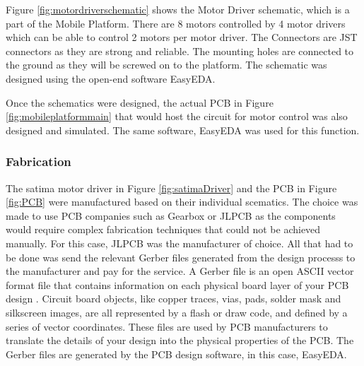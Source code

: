 Figure \ref{fig:motordriverschematic} shows the Motor Driver schematic, which is a part of the Mobile Platform. There are 8 motors controlled by 4 motor drivers which can be able to control 2 motors per motor driver. The Connectors are JST connectors as they are strong and reliable. The mounting holes are connected to the ground as they will be screwed on to the platform. The schematic was designed using the open-end software EasyEDA.
\par
Once the schematics were designed, the actual \ac{PCB} in Figure \ref{fig:mobileplatformmain} that would host the circuit for motor control was also designed and simulated. The same software, EasyEDA was used for this function.

\subsubsection{Fabrication}
The satima motor driver in Figure \ref{fig:satimaDriver} and the \ac{PCB} in Figure \ref{fig:PCB} were manufactured based on their individual scematics. The choice was made to use \ac{PCB} companies such as Gearbox or JLPCB as the components would require complex fabrication techniques that could not be achieved manually. For this case, JLPCB was the manufacturer of choice. All that had to be done was send the relevant Gerber files generated from the design processs to the manufacturer and pay for the service. A Gerber file is an open ASCII vector format file that contains information on each physical board layer of your \ac{PCB} design \cite{team_gerber_2019}. Circuit board objects, like copper traces, vias, pads, solder mask and silkscreen images, are all represented by a flash or draw code, and defined by a series of vector coordinates. These files are used by \ac{PCB} manufacturers to translate the details of your design into the physical properties of the PCB. The Gerber files are generated by the \ac{PCB} design software, in this case, EasyEDA.
